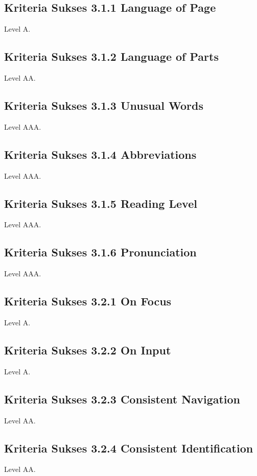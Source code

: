 \subsection{Kriteria Sukses 3.1.1 Language of Page}
\label{sec:kriteria_3.1.1}
Level A.

\subsection{Kriteria Sukses 3.1.2 Language of Parts}
\label{sec:kriteria_3.1.2}
Level AA.

\subsection{Kriteria Sukses 3.1.3 Unusual Words}
\label{sec:kriteria_3.1.3}
Level AAA.

\subsection{Kriteria Sukses 3.1.4 Abbreviations}
\label{sec:kriteria_3.1.4}
Level AAA.

\subsection{Kriteria Sukses 3.1.5 Reading Level}
\label{sec:kriteria_3.1.5}
Level AAA.

\subsection{Kriteria Sukses 3.1.6 Pronunciation}
\label{sec:kriteria_3.1.6}
Level AAA.

\subsection{Kriteria Sukses 3.2.1 On Focus}
\label{sec:kriteria_3.2.1}
Level A.

\subsection{Kriteria Sukses 3.2.2 On Input}
\label{sec:kriteria_3.2.2}
Level A.

\subsection{Kriteria Sukses 3.2.3 Consistent Navigation}
\label{sec:kriteria_3.2.3}
Level AA.

\subsection{Kriteria Sukses 3.2.4 Consistent Identification}
\label{sec:kriteria_3.2.4}
Level AA.

